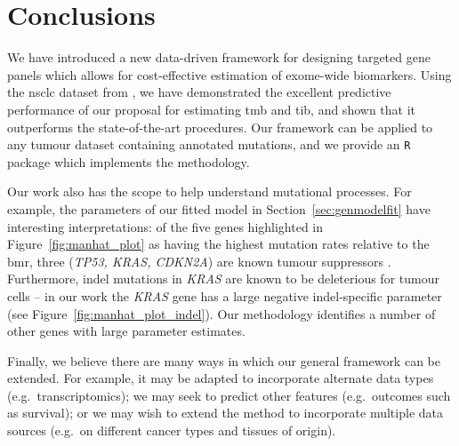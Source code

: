 \documentclass[../thesis.tex]{subfiles}
\begin{document}
\section{Conclusions \label{sec:conclusion}}
 We have introduced a new data-driven framework for designing targeted gene panels which allows for cost-effective estimation of exome-wide biomarkers.  Using the \acrlong{nsclc} dataset from \citet{campbell_distinct_2016}, we have demonstrated the excellent predictive performance of our proposal for estimating \acrlong{tmb} and \acrlong{tib}, and shown that it outperforms the state-of-the-art procedures. Our framework can be applied to any tumour dataset containing annotated mutations, and we provide an \texttt{R} package \citep{bradley_icbiomark_2021} which implements the methodology.
 
Our work also has the scope to help understand mutational processes. For example, the parameters of our fitted model in Section~\ref{sec:genmodelfit} have interesting interpretations: of the five genes highlighted in Figure~\ref{fig:manhat_plot} as having the highest mutation rates relative to the \gls{bmr}, three (\textit{TP53, KRAS, CDKN2A}) are known tumour suppressors \citep{olivier_tp53_2010, jancik_clinical_2010, foulkes_cdkn2a_1997}.  Furthermore, indel mutations in \textit{KRAS} are known to be deleterious for tumour cells \citep{lee_selective_2018} -- in our work the \textit{KRAS} gene has a large negative indel-specific parameter (see Figure~\ref{fig:manhat_plot_indel}).  Our methodology identifies a number of other genes with large parameter estimates.

Finally, we believe there are many ways in which our general framework can be extended. For example, it may be adapted to incorporate alternate data types (e.g.~transcriptomics); we may seek to predict other features (e.g.~outcomes such as survival); or we may wish to extend the method to incorporate multiple data sources (e.g.~on different cancer types and tissues of origin). 

\dobib %
\end{document}
